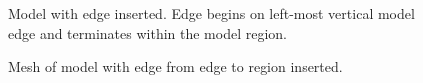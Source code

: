 \documentclass[a4paper, 12pt]{article}
\begin{document}
\begin{figure}[H]
  \centering
  \caption{Model with edge inserted. Edge begins on left-most vertical model edge
        and terminates within the model region.}
  \label{fig:edge4model}
\end{figure}

\begin{figure}[H]
  \centering
  \caption{Mesh of model with edge from edge to region inserted.}
  \label{fig:edge4mesh}
\end{figure}
\end{document}
